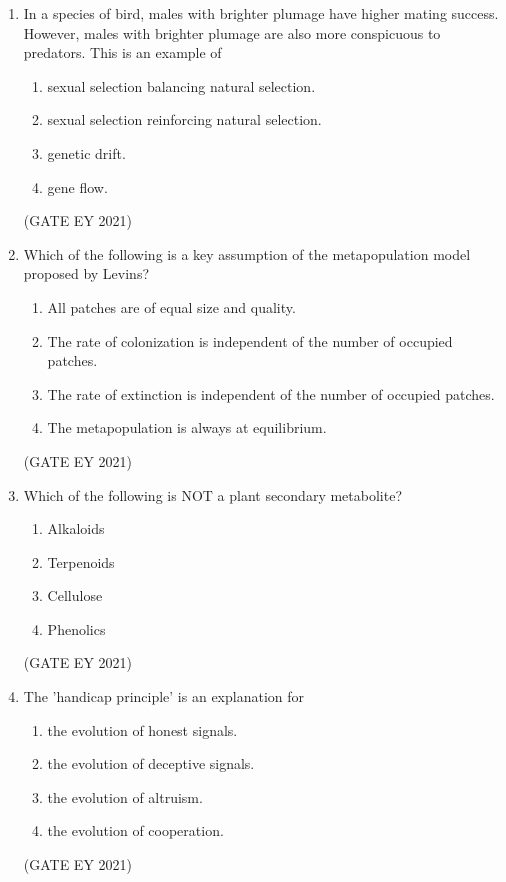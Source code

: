 \documentclass[journal]{IEEEtran}
\begin{document}
\begin{enumerate}
    \item In a species of bird, males with brighter plumage have higher mating success. However, males with brighter plumage are also more conspicuous to predators. This is an example of
    \begin{enumerate}
        \item sexual selection balancing natural selection.
        \item sexual selection reinforcing natural selection.
        \item genetic drift.
        \item gene flow.
    \end{enumerate}
    \hfill{(GATE EY 2021)}

    \item Which of the following is a key assumption of the metapopulation model proposed by Levins?
    \begin{enumerate}
        \item All patches are of equal size and quality.
        \item The rate of colonization is independent of the number of occupied patches.
        \item The rate of extinction is independent of the number of occupied patches.
        \item The metapopulation is always at equilibrium.
    \end{enumerate}
    \hfill{(GATE EY 2021)}

    \item Which of the following is NOT a plant secondary metabolite?
    \begin{multicols}{2}
    \begin{enumerate}
        \item Alkaloids
        \item Terpenoids
        \item Cellulose
        \item Phenolics
    \end{enumerate}
    \end{multicols}
    \hfill{(GATE EY 2021)}

    \item The 'handicap principle' is an explanation for
    \begin{enumerate}
        \item the evolution of honest signals.
        \item the evolution of deceptive signals.
        \item the evolution of altruism.
        \item the evolution of cooperation.
    \end{enumerate}
    \hfill{(GATE EY 2021)}
    

\end{enumerate}
\end{document}
